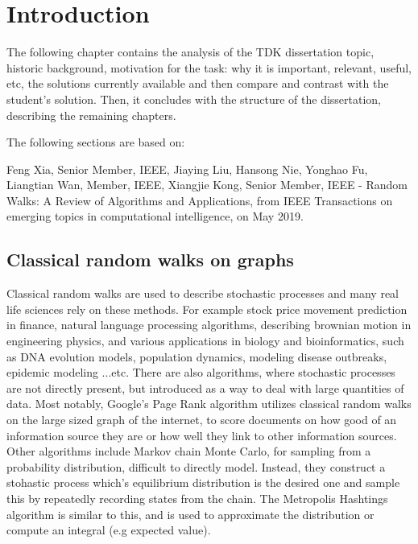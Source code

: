 \chapter{Introduction}

The following chapter contains the analysis of the TDK dissertation topic, historic background, motivation for the task: why it is important, relevant, useful, etc, the solutions currently available and then compare and contrast with the student's solution. Then, it concludes with the structure of the dissertation, describing the remaining chapters.

The following sections are based on:

Feng Xia, Senior Member, IEEE, Jiaying Liu, Hansong Nie, Yonghao Fu, Liangtian Wan, Member, IEEE,
Xiangjie Kong, Senior Member, IEEE - Random Walks: A Review of Algorithms and Applications, from IEEE Transactions on emerging topics in computational intelligence, on May 2019.

\section{Classical random walks on graphs}

Classical random walks are used to describe stochastic processes and many real life sciences rely on these methods. For example stock price movement prediction in finance, natural language processing algorithms, describing brownian motion in engineering physics, and various applications in biology and bioinformatics, such as DNA evolution models, population dynamics, modeling disease outbreaks, epidemic modeling ...etc. There are also algorithms, where stochastic processes are not directly present, but introduced as a way to deal with large quantities of data. Most notably, Google's Page Rank algorithm utilizes classical random walks on the large sized graph of the internet, to score documents on how good of an information source they are or how well they link to other information sources. Other algorithms include Markov chain Monte Carlo, for sampling from a probability distribution, difficult to directly model. Instead, they construct a stohastic process which's equilibrium distribution is the desired one and sample this by repeatedly recording states from the chain. The Metropolis Hashtings algorithm is similar to this, and is used to approximate the distribution or compute an integral (e.g expected value).


